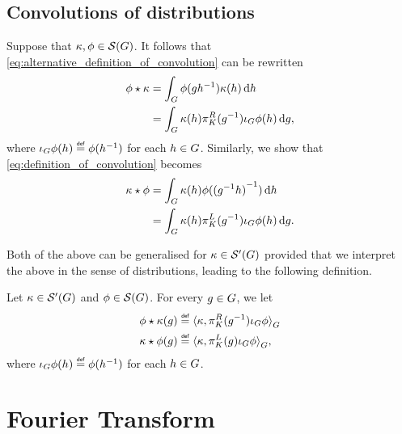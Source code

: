 \subsection{Convolutions of distributions}

Suppose that $\kappa, \phi \in {\mathcal{S} (G)}$.
It follows that \eqref{eq:alternative_definition_of_convolution} can be rewritten
\begin{align*}
    \phi \star \kappa &= \int_G \phi(g h^{-1}) \kappa(h) \,\mathrm{d} h\\
    &= \int_G \kappa(h) \pi^R_{K}(g^{-1}) \iota_{G} \phi(h) \,\mathrm{d} g,
\end{align*}
where $\InverseFunctionArgument \phi(h) \defeq \phi(h^{-1})$ for each $h \in G$.
Similarly, we show that \eqref{eq:definition_of_convolution} becomes
\begin{align*}
    \kappa \star \phi &= \int_G \kappa(h) \phi({(g^{-1} h)}^{-1}) \,\mathrm{d} h\\
    &= \int_G \kappa(h) \pi^L_{K}(g^{-1}) \iota_{G} \phi(h) \,\mathrm{d} g.
\end{align*}

Both of the above can be generalised for $\kappa \in {\mathcal{S}' (G)}$
provided that we interpret the above in the sense of distributions,
leading to the following definition.

\begin{definition}[Convolution]
    Let $\kappa \in {\mathcal{S}' (G)}$ and $\phi \in {\mathcal{S} (G)}$.
    For every $g \in G$,
    we let
    \begin{align*}
        \conv \phi \kappa(g) &\defeq \dualBracket [\Group] \kappa {\RightRegularRepresentation(g^{-1}) \InverseFunctionArgument \phi}\\
        \conv \kappa \phi(g) &\defeq \dualBracket [\Group] \kappa {\LeftRegularRepresentation(g) \InverseFunctionArgument \phi},
    \end{align*}
    where $\InverseFunctionArgument \phi(h) \defeq \phi(h^{-1})$ for each $h \in G$.
\end{definition}

\section{Fourier Transform}

